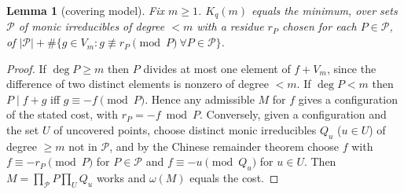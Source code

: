 \documentclass[11pt]{amsart}
\newtheorem{lemma}[theorem]{Lemma}
\theoremstyle{remark}
\begin{document}
\begin{lemma}[covering model]\label{lem:model}
Fix $m\ge1$. $K_q(m)$ equals the minimum, over sets $\mathcal P$ of monic irreducibles of degree $<m$
with a residue $r_P$ chosen for each $P\in\mathcal P$, of
$|\mathcal P|+\#\{g\in V_m: g\not\equiv r_P \pmod P\ \forall P\in\mathcal P\}$.
\end{lemma}
\begin{proof}
If $\deg P\ge m$ then $P$ divides at most one element of $f+V_m$, since the difference of two
distinct elements is nonzero of degree $<m$. If $\deg P<m$ then $P\mid f+g$ iff $g\equiv-f\pmod P$.
Hence any admissible $M$ for $f$ gives a configuration of the stated cost, with $r_P=-f\bmod P$.
Conversely, given a configuration and the set $U$ of uncovered points, choose distinct monic
irreducibles $Q_u$ ($u\in U$) of degree $\ge m$ not in $\mathcal P$, and by the Chinese remainder
theorem choose $f$ with $f\equiv-r_P\pmod P$ for $P\in\mathcal P$ and $f\equiv-u\pmod{Q_u}$ for
$u\in U$. Then $M=\prod_{\mathcal P}P\prod_U Q_u$ works and $\omega(M)$ equals the cost.
\end{proof}
\end{document}
